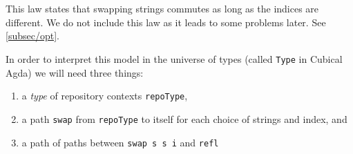 \begin{code}%
\>[0][@{}l@{\AgdaIndent{1}}]%
\>[2]%
\>[175I]\AgdaSymbol{:}%
\>[176I]\AgdaSymbol{(}\AgdaSpace{}%
\AgdaSpace{}%
\AgdaSpace{}%
\AgdaSpace{}%
\AgdaSymbol{:}\AgdaSpace{}%
\AgdaSymbol{)}\AgdaSpace{}%
\AgdaSymbol{(}\AgdaSpace{}%
\AgdaSpace{}%
\AgdaSymbol{:}\AgdaSpace{}%
\AgdaSpace{}%
\AgdaSymbol{)}\AgdaSpace{}%
\AgdaSpace{}%
\AgdaSymbol{(}\AgdaSpace{}%
\AgdaSpace{}%
\AgdaSymbol{)}\AgdaSpace{}%
\<%
\\
\>[.][@{}l@{}]\<[176I]%
\>[10]\AgdaSymbol{(}\AgdaSpace{}%
\AgdaSpace{}%
\AgdaSpace{}%
\AgdaSpace{}%
\AgdaSymbol{)}\AgdaSpace{}%
\AgdaSpace{}%
\AgdaSymbol{(}\AgdaSpace{}%
\AgdaSpace{}%
\AgdaSpace{}%
\AgdaSpace{}%
\AgdaSymbol{)}\<%
\\
\>[.][@{}l@{}]\<[175I]%
\>[8]\AgdaSpace{}%
\AgdaSymbol{(}\AgdaSpace{}%
\AgdaSpace{}%
\AgdaSpace{}%
\AgdaSpace{}%
\AgdaSymbol{)}\AgdaSpace{}%
\AgdaSpace{}%
\AgdaSymbol{(}\AgdaSpace{}%
\AgdaSpace{}%
\AgdaSpace{}%
\AgdaSpace{}%
\AgdaSymbol{)}\<%
\end{code}

This law states that swapping strings commutes as long as the indices are different.
We do not include this law as it leads to some problems later. See \autoref{subsec/opt}.

In order to interpret this model in the universe of types (called \texttt{Type} in Cubical Agda)
we will need three things:
\begin{enumerate}
  \item a \emph{type} of repository contexts \texttt{repoType},
  \item a path \texttt{swap} from \texttt{repoType} to itself for
        each choice of strings and index, and
  \item a path of paths between \texttt{swap s s i} and \texttt{refl}
\end{enumerate}

